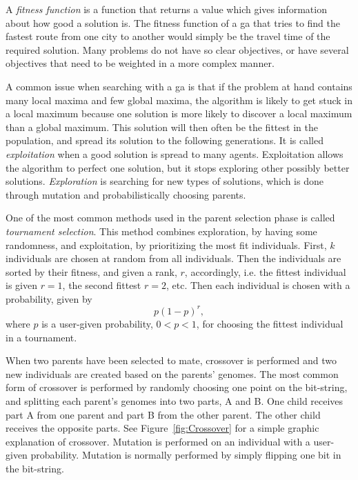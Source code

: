 A \textit{fitness function} is a function that returns a value which gives information about how good a solution is. The fitness function of a \ac{ga} that tries to find the fastest route from one city to another would simply be the travel time of the required solution. Many problems do not have so clear objectives, or have several objectives that need to be weighted in a more complex manner.

A common issue when searching with a \ac{ga} is that if the problem at hand contains many local maxima and few global maxima, the algorithm is likely to get stuck in a local maximum because one solution is more likely to discover a local maximum than a global maximum. This solution will then often be the fittest in the population, and spread its solution to the following generations. It is called \textit{exploitation} when a good solution is spread to many agents. Exploitation allows the algorithm to perfect one solution, but it stops exploring other possibly better solutions. \textit{Exploration} is searching for new types of solutions, which is done through mutation and probabilistically choosing parents. 

One of the most common methods used in the parent selection phase is called \textit{tournament selection}. This method combines exploration, by having some randomness, and exploitation, by prioritizing the most fit individuals. First, $k$ individuals are chosen at random from all individuals. Then the individuals are sorted by their fitness, and given a rank, $r$, accordingly, i.e. the fittest individual is given $r=1$, the second fittest $r=2$, etc. Then each individual is chosen with a probability, given by
\begin{equation}
p(1-p)^r,
\end{equation}
where $p$ is a user-given probability, $0 < p < 1$, for choosing the fittest individual in a tournament. 

When two parents have been selected to mate, crossover is performed and two new individuals are created based on the parents' genomes. The most common form of crossover is performed by randomly choosing one point on the bit-string, and splitting each parent's genomes into two parts, A and B. One child receives part A from one parent and part B from the other parent. The other child receives the opposite parts. See Figure~\ref{fig:Crossover} for a simple graphic explanation of crossover. Mutation is performed on an individual with a user-given probability. Mutation is normally performed by simply flipping one bit in the bit-string.

